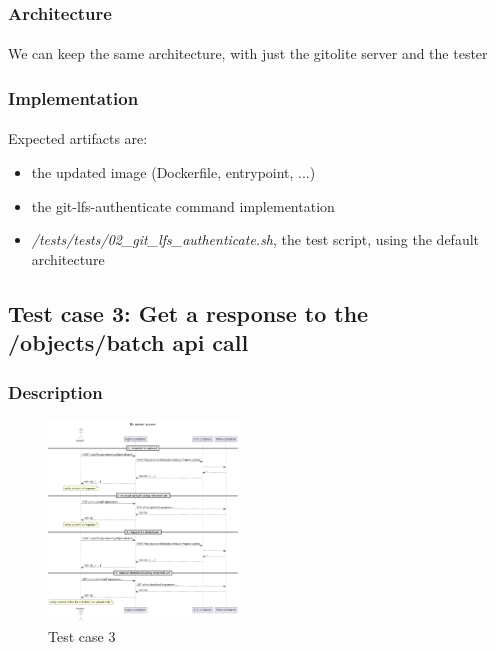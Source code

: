\subsubsection{Architecture}

\paragraph{}
We can keep the same architecture, with just the gitolite server and the tester

\subsubsection{Implementation}

\paragraph{}
Expected artifacts are:

\begin{itemize}
    \item the updated image (Dockerfile, entrypoint, ...)
    \item the git-lfs-authenticate command implementation
    \item \textit{/tests/tests/02\_git\_lfs\_authenticate.sh}, the test script, using the default architecture
\end{itemize}

\newpage
\subsection{Test case 3: Get a response to the /objects/batch api call}

\subsubsection{Description}

\begin{figure}
    \begin{center}
        \includegraphics[width=0.45\textwidth]{prototyping/diagrams/lfs_server_access}
    \end{center}
    \caption{Test case 3}
\end{figure}

